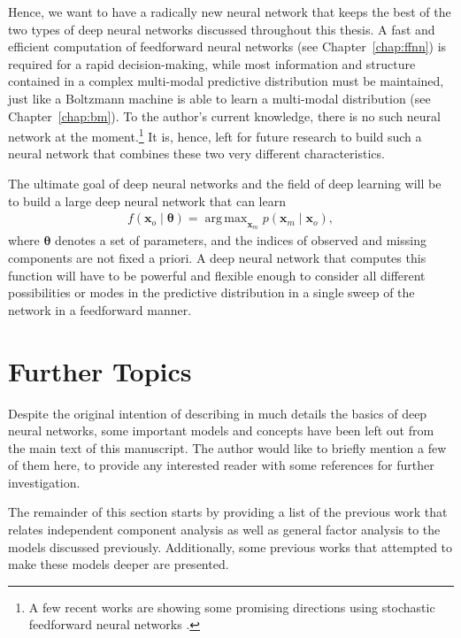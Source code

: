 \documentclass{now}
\newcommand{\vect}[1]{\mathbf{#1}}
\newcommand{\vects}[1]{\boldsymbol{#1}}
\newcommand{\vx}[0]{\vect{x}}
\newcommand{\TT}[0]{{\vects{\theta}}}
\DeclareMathOperator*{\argmax}{arg\,max}
\begin{document}
Hence, we want to have a radically new neural network that keeps the best of the
two types of deep neural networks discussed throughout this thesis. A fast and
efficient computation of feedforward neural networks (see
Chapter~\ref{chap:ffnn}) is required for a rapid decision-making, while most
information and structure contained in a complex multi-modal predictive
distribution must be maintained, just like a Boltzmann machine is able to learn
a multi-modal distribution (see Chapter~\ref{chap:bm}). To the author's current
knowledge, there is no such neural network at the moment.\footnote{ 
    A few recent works are showing some promising directions using stochastic
    feedforward neural networks \citet[see, e.g.,][]{Bengio2014,Tang2013}.
} 
It is, hence, left for future research to build such a neural network that
combines these two very different characteristics.

The ultimate goal of deep neural networks and the field of deep learning will be
to build a large deep neural network that can learn
\begin{align*}
    f(\vx_o\mid \TT) = \argmax_{\vx_m} p(\vx_m \mid \vx_o),
\end{align*}
where $\TT$ denotes a set of parameters, and the indices of observed and missing
components are not fixed a priori. A deep neural network that computes this
function will have to be powerful and flexible enough to consider all different
possibilities or modes in the predictive distribution in a single sweep of the
network in a feedforward manner.



\section{Further Topics}
\label{sec:leftovers}

Despite the original intention of describing in much details the basics of deep
neural networks, some important models and concepts have been left out from the
main text of this manuscript. The author would like to briefly mention a few of
them here, to provide any interested reader with some references for further
investigation.

The remainder of this section starts by providing a list of the previous work
that relates independent component analysis as well as general factor analysis
to the models discussed previously.  Additionally, some previous works that
attempted to make these models deeper are presented.  
\end{document}
